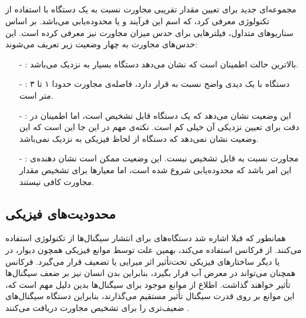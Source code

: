 \documentclass[oneside]{report}
\begin{document}
 \subsection{{\normalsize {}}}
  {\normalsize {}}
  مجموعه‌ای جدید برای تعیین مقدار تقریبی مجاورت نسبت به یک دستگاه با استفاده از تکنولوژی 
   {\normalsize {}}
   معرفی کرد، که اسم این فرآیند 
    {\normalsize {}}
    و یا محدوده‌یابی می‌باشد. 
    بر اساس سناریو‌های متداول،
     {\normalsize {}}
       فیلترهایی برای حدس میزان مجاورت نیز معرفی کرده است. این حدس‌های مجاورت به چهار وضعیت زیر تعریف می‌شوند:‌
     \begin{itemize}
     	\item[-]  {\normalsize {}:}
     	بالاترین حالت اطمینان است که نشان می‌دهد دستگاه بسیار به 
     	 {\normalsize {}}
     	 نزدیک می‌باشد.
     	\item[-]  {\normalsize {}:}
   دستگاه با یک دیدی واضح نسبت به 
    {\normalsize {}}
    قرار دارد، فاصله‌ی مجاورت حدودا ۱ تا ۳ متر است.  
     	\item[-] {\normalsize {}:}
     	این وضعیت نشان می‌دهد که یک دستگاه
     	 {\normalsize {}}
     	 قابل تشخیص است،  اما اطمینان در دقت برای تعیین نزدیکی آن خیلی کم است. نکته‌ی مهم در این جا این است که این وضعیت نشان نمی‌دهد که دستگاه از لحاظ فیزیکی به 
     	  {\normalsize {}}
     	  نزدیک نمی‌باشد.  
     	\item[-] {\normalsize {}:}
     	مجاورت نسبت به 
     	 {\normalsize {}}
     	 قابل تشخیص نیست. این وضعیت ممکن است نشان دهنده‌ی این امر باشد که محدوده‌یابی شروع شده است، اما معیارها برای تشخیص مقدار مجاورت کافی نیستند. 
     \end{itemize}
    
    \subsection{محدودیت‌های فیزیکی}
  همانطور که قبلا اشاره شد  دستگاه‌های 
         	  {\normalsize {}}
         	  برای انتشار سیگنال‌ها از تکنولوژی
         	       	  {\normalsize {}}
     استفاده می‌کنند. 
          	  {\normalsize {}}
     از فرکانس 
          	  {\normalsize {}}
          	   استفاده می‌کند، بهمین علت توسط موانع فیزیکی همچون دیوار، در یا دیگر ساختار‌های فیزیکی تحت‌تأثیر اثر میرایی یا تضعیف قرار می‌گیرد. فرکانس 
          	        	  {\normalsize {}} 
  همچنان می‌تواند در معرض آب قرار بگیرد، بنابراین بدن انسان نیز بر ضعف سیگنال‌ها تأثیر خواهند گذاشت. 
  اطلاع از موانع موجود برای سیگنال‌‌ها بدین دلیل مهم است که، این موانع بر روی قدرت سیگنال تأثیر مستقیم می‌گذارند،   بنابراین دستگاه 
       	  {\normalsize {}}
       	  سیگنال‌های ضعیف‌تری را برای تشخیص مجاورت دریافت می‌کنند  	        	     	       	  
\cite{ibeacover}.
   
\end{document}
